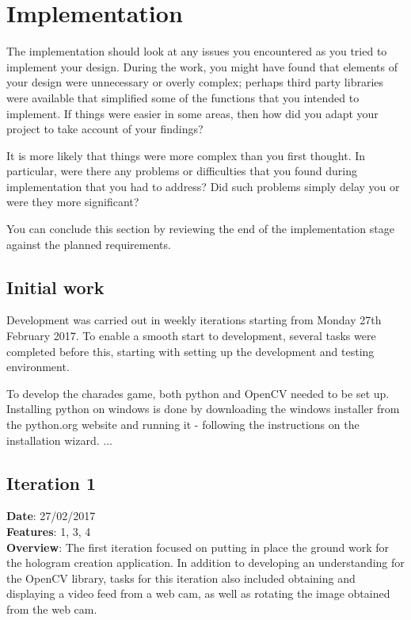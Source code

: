 \chapter{Implementation}

The implementation should look at any issues you encountered as you tried to implement your design. During the work, you might have found that elements of your design were unnecessary or overly complex; perhaps third party libraries were available that simplified some of the functions that you intended to implement. If things were easier in some areas, then how did you adapt your project to take account of your findings?

It is more likely that things were more complex than you first thought. In particular, were there any problems or difficulties that you found during implementation that you had to address? Did such problems simply delay you or were they more significant? 

You can conclude this section by reviewing the end of the implementation stage against the planned requirements. 

\section{Initial work}
Development was carried out in weekly iterations starting from Monday 27th February 2017. To enable a smooth start to development, several tasks were completed before this, starting with setting up the development and testing environment.

To develop the charades game, both python and OpenCV needed to be set up. Installing python on windows is done by downloading the windows installer from the python.org website and running it - following the instructions on the installation wizard. 
...


\section{Iteration 1}
\textbf{Date}: 27/02/2017 \\
\textbf{Features}: 1, 3, 4 \\
\textbf{Overview}: The first iteration focused on putting in place the ground work for the hologram creation application. In addition to developing an understanding for the OpenCV library, tasks for this iteration also included obtaining and displaying a video feed from a web cam, as well as rotating the image obtained from the web cam.

